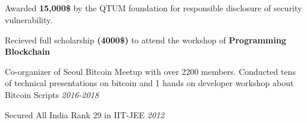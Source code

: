 \documentclass[margin,line]{resume}
\begin{document}
\begin{resume}
\section{}
\begin{list2}
\item Awarded \textbf{15,000\$} by the QTUM foundation for responsible disclosure of security vulnerability.\\
\vspace{-3.5mm}
\item Recieved full scholarship \textbf{(4000\$)} to attend the workshop of \textbf{Programming Blockchain}\\
\vspace{-3.5mm}
\item Co-organizer of Seoul Bitcoin Meetup with over 2200 members. Conducted tens of technical presentations on bitcoin and 1 hands on developer workshop about Bitcoin Scripts \hfill \textit{2016-2018}\\
\vspace{-3.5mm}
\item Secured All India Rank 29 in IIT-JEE \hfill \textit{2012}\\
\vspace{-3.5mm}
\end{list2}
 
 \end{resume}
\end{document}
